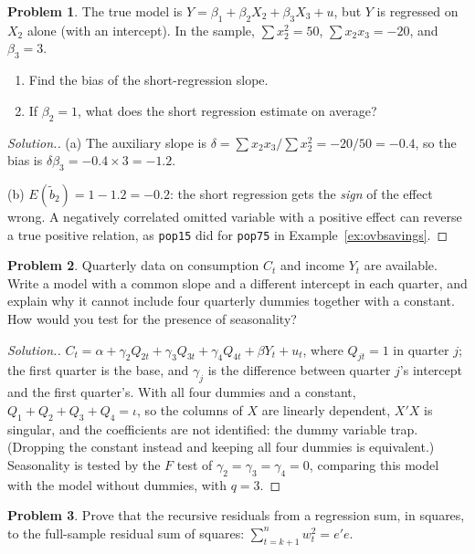 \documentclass[11pt,a4paper]{article}
\numberwithin{equation}{section}
\theoremstyle{definition}
\newtheorem{problemx}{Problem}[subsection]
\newenvironment{problem}{\begin{problemx}}{\end{problemx}}
\newenvironment{solution}
  {\renewcommand{\qedsymbol}{}\begin{proof}[\textit{Solution}.]}
  {\end{proof}}
\begin{document}
\begin{problem}
The true model is $Y = \beta_1 + \beta_2X_2 + \beta_3X_3 + u$, but $Y$ is regressed on $X_2$ alone (with an intercept). In the sample, $\sum x_2^2 = 50$,
$\sum x_2x_3 = -20$, and $\beta_3 = 3$.
\begin{enumerate}[label=(\alph*)]
\item Find the bias of the short-regression slope.
\item If $\beta_2 = 1$, what does the short regression estimate on average?
\end{enumerate}
\end{problem}

\begin{solution}
(a) The auxiliary slope is $\delta = \sum x_2x_3/\sum x_2^2 = -20/50 = -0.4$, so the bias is $\delta\beta_3 = -0.4 \times 3 = -1.2$.

(b) $E(\tilde b_2) = 1 - 1.2 = -0.2$: the short regression gets the \emph{sign} of the effect wrong. A negatively correlated omitted variable with a positive
effect can reverse a true positive relation, as \texttt{pop15} did for \texttt{pop75} in Example~\ref{ex:ovbsavings}.
\end{solution}

\begin{problem}
Quarterly data on consumption $C_t$ and income $Y_t$ are available. Write a model with a common slope and a different intercept in each quarter, and
explain why it cannot include four quarterly dummies together with a constant. How would you test for the presence of seasonality?
\end{problem}

\begin{solution}
$C_t = \alpha + \gamma_2Q_{2t} + \gamma_3Q_{3t} + \gamma_4Q_{4t} + \beta Y_t + u_t$, where $Q_{jt} = 1$ in quarter $j$; the first quarter is the base, and $\gamma_j$ is the difference
between quarter $j$'s intercept and the first quarter's. With all four dummies and a constant, $Q_1 + Q_2 + Q_3 + Q_4 = \iota$, so the columns of $X$ are linearly
dependent, $X'X$ is singular, and the coefficients are not identified: the dummy variable trap. (Dropping the constant instead and keeping all four
dummies is equivalent.) Seasonality is tested by the $F$ test of $\gamma_2 = \gamma_3 = \gamma_4 = 0$, comparing this model with the model without dummies, with $q = 3$.
\end{solution}

\begin{problem}
Prove that the recursive residuals from a regression sum, in squares, to the full-sample residual sum of squares: $\sum_{t=k+1}^n w_t^2 = e'e$.
\end{problem}
\end{document}
